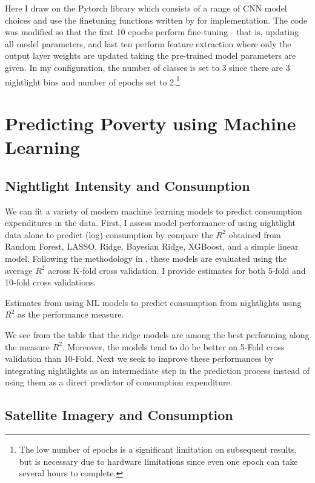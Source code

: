 \documentclass[11pt, a4paper, leqno]{article}
\begin{document}
 Here I draw on the Pytorch library which consists of a range of CNN model choices and use the finetuning functions written by \citet{pytut} for implementation. The code was modified so that the first 10 epochs perform fine-tuning - that is, updating all model parameters, and last ten perform feature extraction where only the output layer weights are updated taking the pre-trained model parameters are given. In my configuration, the number of classes is set to 3 since there are 3 nightlight bins and number of epochs set to 2.\footnote{The low number of epochs is a significant limitation on subsequent results, but is necessary due to hardware limitations since even one epoch can take several hours to complete.}

\section{Predicting Poverty using Machine Learning }

\subsection{Nightlight Intensity and Consumption}

 We can fit a variety of modern machine learning models to predict consumption expenditures in the data. First, I assess model performance of using nightlight data alone to predict (log) consumption by compare the $R^2$ obtained from Random Forest, LASSO, Ridge, Bayesian Ridge, XGBoost, and a simple linear model. Following the methodology in \citet{jean2016combining}, these models are evaluated using the average $R^2$ across K-fold cross validation. I provide estimates for both 5-fold and 10-fold cross validations.

\begin{table}[H]
\centering
    \scalebox{1.1}{}
\caption{Estimates from using ML models to predict consumption from nightlights using $R^2$ as the performance measure.}
\end{table}

 We see from the table that the ridge models are among the best performing along the measure $R^2$.  Moreover, the models tend to do be better on 5-Fold cross validation than 10-Fold. Next we seek to improve these performances by integrating nightlights as an intermediate step in the prediction process instead of using them as a direct predictor of consumption expenditure. 

\subsection{Satellite Imagery and Consumption}
\end{document}

